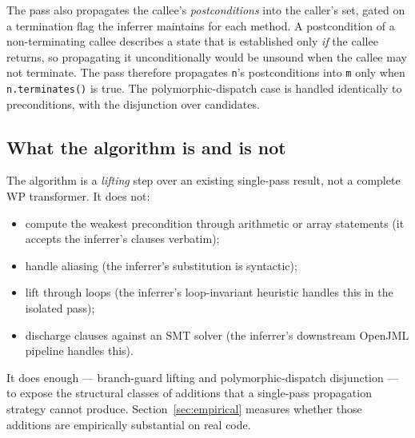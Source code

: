 The pass also propagates the callee's \emph{postconditions} into the
caller's set, gated on a termination flag the inferrer maintains for
each method. A postcondition of a non-terminating callee describes a
state that is established only \emph{if} the callee returns, so
propagating it unconditionally would be unsound when the callee may
not terminate. The pass therefore propagates \texttt{n}'s
postconditions into \texttt{m} only when \texttt{n.terminates()} is
true. The polymorphic-dispatch case is handled identically to
preconditions, with the disjunction over candidates.

\subsection{What the algorithm is and is not}

The algorithm is a \emph{lifting} step over an existing single-pass
result, not a complete WP transformer. It does not:

\begin{itemize}\setlength\itemsep{0.2em}
  \item compute the weakest precondition through arithmetic or array
        statements (it accepts the inferrer's clauses verbatim);
  \item handle aliasing (the inferrer's substitution is syntactic);
  \item lift through loops (the inferrer's loop-invariant heuristic
        handles this in the isolated pass);
  \item discharge clauses against an SMT solver (the inferrer's
        downstream OpenJML pipeline handles this).
\end{itemize}

It does enough --- branch-guard lifting and polymorphic-dispatch
disjunction --- to expose the structural classes of additions that a
single-pass propagation strategy cannot produce. Section~\ref{sec:empirical}
measures whether those additions are empirically substantial on real
code.
